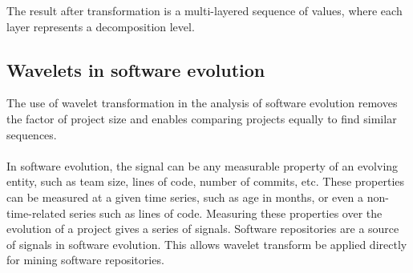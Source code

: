 The result after transformation is a multi-layered sequence of values, where
each layer represents a decomposition level.

\subsection{Wavelets in software evolution}
The use of wavelet transformation in the analysis of software evolution removes
the factor of project size and enables comparing projects equally to find
similar sequences.

\paragraph{}
In software evolution, the signal can be any measurable property of an evolving
entity, such as team size, lines of code, number of commits, etc.
These properties can be measured at a given time series, such as age in months,
or even a non-time-related series such as lines of code. Measuring these
properties over the evolution of a project gives a series of signals. Software
repositories are a source of signals in software evolution. This allows wavelet
transform be applied directly for mining software repositories.


\begin{comment}
This section describes the methods used to answer the research questions. A
good structure of this section often follows the sub questions by providing a
method for each.

The research method can be based on the “Scientific method”, but more creative
solutions could be defined as well. In any case, the method needs a thorough
motivation grounded in theory in order to be acceptable.

As part of the method a number of hypotheses are described. These hypotheses
will be tested by the research, using the methods described here.

An important part of this section is validation. How will you evaluate and
validate the outcomes of the research? You can look at Paul Klint’s homepage
for examples of this section as
well\footnote{http://homepages.cwi.nl/~paulk/thesesMasterSoftwareEngineering/2006/RichardKettelerij.pdf}.
\end{comment}